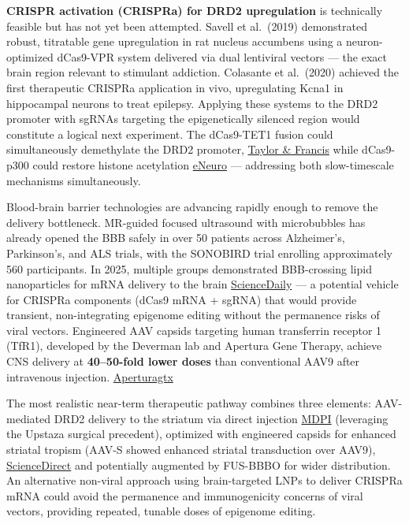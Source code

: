 \textbf{CRISPR activation (CRISPRa) for DRD2 upregulation} is technically feasible but has not yet been attempted. Savell et al.~(2019) demonstrated robust, titratable gene upregulation in rat nucleus accumbens using a neuron-optimized dCas9-VPR system delivered via dual lentiviral vectors --- the exact brain region relevant to stimulant addiction. Colasante et al.~(2020) achieved the first therapeutic CRISPRa application in vivo, upregulating Kcna1 in hippocampal neurons to treat epilepsy. Applying these systems to the DRD2 promoter with sgRNAs targeting the epigenetically silenced region would constitute a logical next experiment. The dCas9-TET1 fusion could simultaneously demethylate the DRD2 promoter, \href{https://www.tandfonline.com/doi/full/10.2217/epi-2023-0281}{Taylor \& Francis} while dCas9-p300 could restore histone acetylation \href{https://www.eneuro.org/content/12/8/ENEURO.0157-25.2025}{eNeuro} --- addressing both slow-timescale mechanisms simultaneously.

Blood-brain barrier technologies are advancing rapidly enough to remove the delivery bottleneck. MR-guided focused ultrasound with microbubbles has already opened the BBB safely in over 50 patients across Alzheimer's, Parkinson's, and ALS trials, with the SONOBIRD trial enrolling approximately 560 participants. In 2025, multiple groups demonstrated BBB-crossing lipid nanoparticles for mRNA delivery to the brain \href{https://www.sciencedaily.com/releases/2025/02/250217133446.htm}{ScienceDaily} --- a potential vehicle for CRISPRa components (dCas9 mRNA + sgRNA) that would provide transient, non-integrating epigenome editing without the permanence risks of viral vectors. Engineered AAV capsids targeting human transferrin receptor 1 (TfR1), developed by the Deverman lab and Apertura Gene Therapy, achieve CNS delivery at \textbf{40--50-fold lower doses} than conventional AAV9 after intravenous injection. \href{https://aperturagtx.com/news/apertura-gene-therapy-unveils-novel-engineered-aav-capsids-targeting-human-transferrin-receptor-1-for-neurological-gene-therapy-delivery/}{Aperturagtx}

The most realistic near-term therapeutic pathway combines three elements: AAV-mediated DRD2 delivery to the striatum via direct injection \href{https://www.mdpi.com/2073-4425/8/2/63}{MDPI} (leveraging the Upstaza surgical precedent), optimized with engineered capsids for enhanced striatal tropism (AAV-S showed enhanced striatal transduction over AAV9), \href{https://www.sciencedirect.com/science/article/pii/S2329050123000633}{ScienceDirect} and potentially augmented by FUS-BBBO for wider distribution. An alternative non-viral approach using brain-targeted LNPs to deliver CRISPRa mRNA could avoid the permanence and immunogenicity concerns of viral vectors, providing repeated, tunable doses of epigenome editing.

